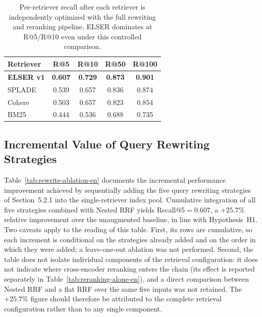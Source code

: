 \begin{table}[h]
\centering
\small
\begin{tabular}{lcccc}
\toprule
\textbf{Retriever} & \textbf{R@5} & \textbf{R@10} & \textbf{R@50} & \textbf{R@100} \\
\midrule
\textbf{ELSER v1} & \textbf{0.607} & \textbf{0.729} & \textbf{0.873} & \textbf{0.901} \\
SPLADE & 0.539 & 0.657 & 0.836 & 0.874 \\
Cohere & 0.503 & 0.657 & 0.823 & 0.854 \\
BM25 & 0.444 & 0.536 & 0.688 & 0.735 \\
\bottomrule
\end{tabular}
\caption{Per-retriever recall after each retriever is independently optimized with the full rewriting and reranking pipeline. ELSER dominates at R@5/R@10 even under this controlled comparison.}
\label{tab:retriever-optimized-en}
\end{table}

\subsection{Incremental Value of Query Rewriting Strategies}

Table~\ref{tab:rewrite-ablation-en} documents the incremental performance improvement achieved by sequentially adding the five query rewriting strategies of Section~5.2.1 into the single-retriever index pool. Cumulative integration of all five strategies combined with Nested RRF yields Recall@5$=0.607$, a $+25.7\%$ relative improvement over the unaugmented baseline, in line with Hypothesis~H1. Two caveats apply to the reading of this table. First, its rows are cumulative, so each increment is conditional on the strategies already added and on the order in which they were added; a leave-one-out ablation was not performed. Second, the table does not isolate individual components of the retrieval configuration: it does not indicate where cross-encoder reranking enters the chain (its effect is reported separately in Table~\ref{tab:reranking-alone-en}), and a direct comparison between Nested RRF and a flat RRF over the same five inputs was not retained. The $+25.7\%$ figure should therefore be attributed to the complete retrieval configuration rather than to any single component.

